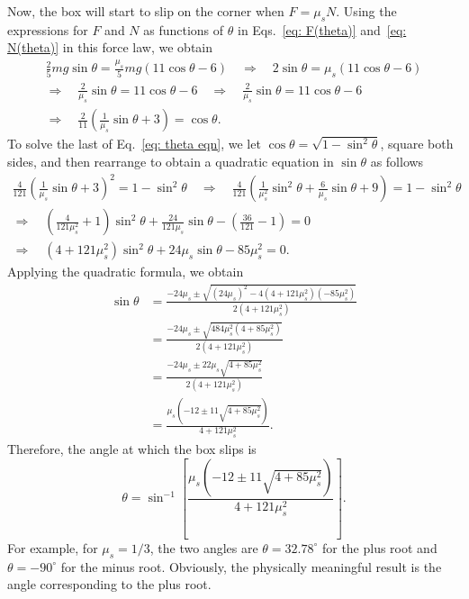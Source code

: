 Now, the box will start to slip on the corner when $F = \mu_s N$. Using the expressions for $F$ and $N$ as functions of $\theta$ in Eqs.~\eqref{eq: F(theta)} and~\eqref{eq: N(theta)} in this force law, we obtain
\begin{multline}
\label{eq: theta eqn}
\frac{2}{5} mg \sin\theta = \frac{\mu_s}{5} m g \left( 11\cos\theta - 6 \right)
\quad \Rightarrow \quad
2\sin\theta = \mu_s \left( 11\cos\theta - 6 \right) \\
\Rightarrow \quad \frac{2}{\mu_s} \sin\theta = 11 \cos\theta - 6
\quad \Rightarrow \quad
\frac{2}{\mu_s} \sin\theta = 11 \cos\theta - 6 \\
\Rightarrow \quad \frac{2}{11} \left( \frac{1}{\mu_s} \sin\theta + 3 \right) = \cos\theta.
\end{multline}
To solve the last of Eq.~\eqref{eq: theta eqn}, we let $\cos\theta = \sqrt{1 - \sin^2\theta}$, square both sides, and then rearrange to obtain a quadratic equation in $\sin\theta$ as follows
\begin{multline}
\frac{4}{121} \left( \frac{1}{\mu_s} \sin\theta + 3 \right)^{\!2} = 1 - \sin^2\theta
\quad \Rightarrow \quad
\frac{4}{121} \left( \frac{1}{\mu_s^2} \sin^2\theta + \frac{6}{\mu_s} \sin\theta + 9 \right) = 1 - \sin^2\theta \\
\Rightarrow \quad
\left( \frac{4}{121\mu_s^2} + 1 \right) \sin^2\theta + \frac{24}{121\mu_s} \sin\theta - \left( \frac{36}{121} - 1 \right) = 0 \\
\Rightarrow \quad
\left( 4 + 121\mu_s^2 \right) \sin^2\theta + 24 \mu_s \sin\theta - 85 \mu_s^2 = 0.
\end{multline}
Applying the quadratic formula, we obtain
\begin{align*}
\sin\theta &=
\frac{
-24\mu_s \pm \sqrt{ (24\mu_s)^2 - 4 \left(4 + 121\mu_s^2\right)\left(-85\mu_s^2\right) }
}
{
2 \left( 4 + 121\mu_s^2 \right)
} \\
&=
\frac{
-24\mu_s \pm \sqrt{ 484\mu_s^2 \left(4 + 85\mu_s^2\right) }
}
{
2 \left( 4 + 121\mu_s^2 \right)
} \\
&=
\frac{
-24\mu_s \pm 22\mu_s \sqrt{ 4 + 85\mu_s^2 }
}
{
2 \left( 4 + 121\mu_s^2 \right)
} \\
&=
\frac{
\mu_s \left( -12 \pm 11 \sqrt{ 4 + 85\mu_s^2 } \right)
}
{
4 + 121\mu_s^2
}.
\end{align*}
Therefore, the angle at which the box slips is
\[
\theta = \sin^{-1} \left[ \frac{
\mu_s \left( -12 \pm 11 \sqrt{ 4 + 85\mu_s^2 } \right)
}
{
4 + 121\mu_s^2
} \right].
\]
For example, for $\mu_s = 1/3$, the two angles are $\theta = 32.78^\circ$ for the plus root and $\theta = -90^\circ$ for the minus root. Obviously, the physically meaningful result is the angle corresponding to the plus root.


